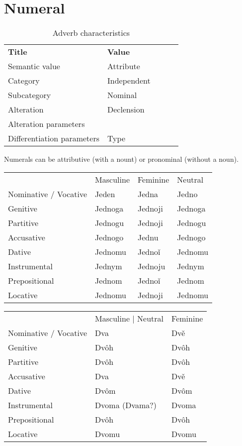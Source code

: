 \section{Numeral}

\begin{table}[h]
	\caption{Adverb characteristics}
	\begin{tabular}{lllll}
		\textbf{Title}              & \textbf{Value}      \\
		Semantic value              & Attribute           \\
		Category                    & Independent         \\
		Subcategory                 & Nominal             \\
		Alteration                  & Declension          \\
		Alteration parameters       &               \\
		Differentiation parameters  & Type
	\end{tabular}
\end{table}

Numerals can be attributive (with a nount) or pronominal (without a noun).
	
\begin{table}
	\begin{tabular}{llll}
		& Masculine & Feminine & Neutral \\
		Nominative / Vocative & Jeden & Jedna & Jedno \\
		Genitive & Jednoga & Jednoji & Jednoga \\
		Partitive & Jednogu & Jednoji & Jednogu \\
		Accusative & Jednogo & Jednu & Jednogo \\
		Dative & Jednomu & Jednoǐ & Jednomu \\
		Instrumental & Jednym & Jednoju & Jednym \\
		Prepositional & Jednom & Jednoǐ & Jednom \\
		Locative & Jednomu & Jednoji & Jednomu \\
	\end{tabular}
\end{table}

\begin{table}
	\begin{tabular}{lll}
		& Masculine | Neutral & Feminine \\
		Nominative / Vocative & Dva & Dvě \\
		Genitive & Dvôh & Dvôh \\
		Partitive & Dvôh & Dvôh \\
		Accusative & Dva & Dvě \\
		Dative & Dvôm & Dvôm \\
		Instrumental & Dvoma  (Dvama?) & Dvoma \\
		Prepositional & Dvôh & Dvôh \\
		Locative & Dvomu & Dvomu \\
	\end{tabular}
\end{table}

